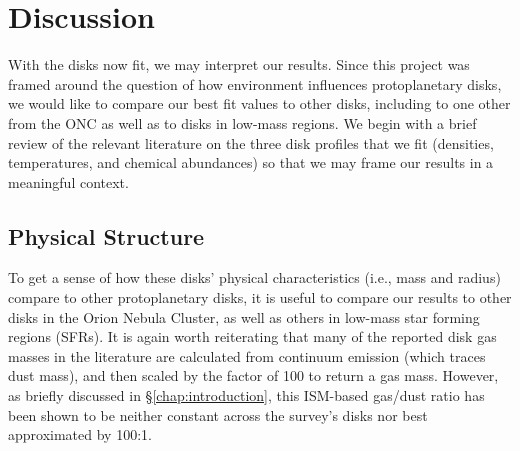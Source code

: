 \chapter{Discussion}
\label{chap:discussion}



With the disks now fit, we may interpret our results. Since this project was framed around the question of how environment influences protoplanetary disks, we would like to compare our best fit values to other disks, including to one other from the ONC \citep{Factor2017} as well as to disks in low-mass regions. We begin with a brief review of the relevant literature on the three disk profiles that we fit (densities, temperatures, and chemical abundances) so that we may frame our results in a meaningful context.








\section{Physical Structure}





To get a sense of how these disks' physical characteristics (i.e., mass and radius) compare to other protoplanetary disks, it is useful to compare our results to other disks in the Orion Nebula Cluster, as well as others in low-mass star forming regions (SFRs). It is again worth reiterating that many of the reported disk gas masses in the literature \citep[as well as the values we use here from][]{Williams2014} are calculated from continuum emission (which traces dust mass), and then scaled by the factor of 100 to return a gas mass. However, as briefly discussed in \S\ref{chap:introduction}, this ISM-based gas/dust ratio has been shown to be neither constant across the survey's disks nor best approximated by 100:1.


